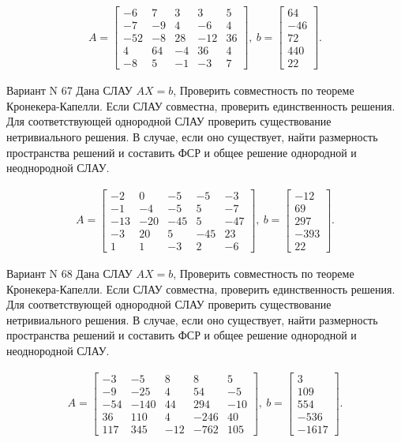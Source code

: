 \documentclass[11pt]{report}
\begin{document}
\begin{align*}
 A = \left[\begin{matrix}-6 & 7 & 3 & 3 & 5\\-7 & -9 & 4 & -6 & 4\\-52 & -8 & 28 & -12 & 36\\4 & 64 & -4 & 36 & 4\\-8 & 5 & -1 & -3 & 7\end{matrix}\right],
\ b = \left[\begin{matrix}64\\-46\\72\\440\\22\end{matrix}\right]. 
 \end{align*}

Вариант N 67
Дана СЛАУ $AX = b$,
Проверить совместность по теореме Кронекера-Капелли. Если СЛАУ совместна, проверить единственность решения.
Для соответствующей однородной СЛАУ проверить существование нетривиального решения. В случае, если оно существует,
найти размерность пространства решений и составить ФСР и общее решение однородной  и неоднородной СЛАУ.


\begin{align*}
 A = \left[\begin{matrix}-2 & 0 & -5 & -5 & -3\\-1 & -4 & -5 & 5 & -7\\-13 & -20 & -45 & 5 & -47\\-3 & 20 & 5 & -45 & 23\\1 & 1 & -3 & 2 & -6\end{matrix}\right],
\ b = \left[\begin{matrix}-12\\69\\297\\-393\\22\end{matrix}\right]. 
 \end{align*}

Вариант N 68
Дана СЛАУ $AX = b$,
Проверить совместность по теореме Кронекера-Капелли. Если СЛАУ совместна, проверить единственность решения.
Для соответствующей однородной СЛАУ проверить существование нетривиального решения. В случае, если оно существует,
найти размерность пространства решений и составить ФСР и общее решение однородной  и неоднородной СЛАУ.


\begin{align*}
 A = \left[\begin{matrix}-3 & -5 & 8 & 8 & 5\\-9 & -25 & 4 & 54 & -5\\-54 & -140 & 44 & 294 & -10\\36 & 110 & 4 & -246 & 40\\117 & 345 & -12 & -762 & 105\end{matrix}\right],
\ b = \left[\begin{matrix}3\\109\\554\\-536\\-1617\end{matrix}\right]. 
 \end{align*}
\end{document}
